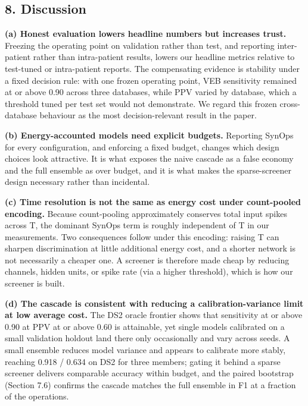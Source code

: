 \documentclass[
]{article}
\begin{document}
\subsection{8. Discussion}\label{discussion}

\textbf{(a) Honest evaluation lowers headline numbers but increases
trust.} Freezing the operating point on validation rather than test, and
reporting inter-patient rather than intra-patient results, lowers our
headline metrics relative to test-tuned or intra-patient reports. The
compensating evidence is stability under a fixed decision rule: with one
frozen operating point, VEB sensitivity remained at or above 0.90 across
three databases, while PPV varied by database, which a threshold tuned
per test set would not demonstrate. We regard this frozen cross-database
behaviour as the most decision-relevant result in the paper.

\textbf{(b) Energy-accounted models need explicit budgets.} Reporting
SynOps for every configuration, and enforcing a fixed budget, changes
which design choices look attractive. It is what exposes the naive
cascade as a false economy and the full ensemble as over budget, and it
is what makes the sparse-screener design necessary rather than
incidental.

\textbf{(c) Time resolution is not the same as energy cost under
count-pooled encoding.} Because count-pooling approximately conserves
total input spikes across T, the dominant SynOps term is roughly
independent of T in our measurements. Two consequences follow under this
encoding: raising T can sharpen discrimination at little additional
energy cost, and a shorter network is not necessarily a cheaper one. A
screener is therefore made cheap by reducing channels, hidden units, or
spike rate (via a higher threshold), which is how our screener is built.

\textbf{(d) The cascade is consistent with reducing a
calibration-variance limit at low average cost.} The DS2 oracle frontier
shows that sensitivity at or above 0.90 at PPV at or above 0.60 is
attainable, yet single models calibrated on a small validation holdout
land there only occasionally and vary across seeds. A small ensemble
reduces model variance and appears to calibrate more stably, reaching
0.918 / 0.634 on DS2 for three members; gating it behind a sparse
screener delivers comparable accuracy within budget, and the paired
bootstrap (Section 7.6) confirms the cascade matches the full ensemble
in F1 at a fraction of the operations.
\end{document}
